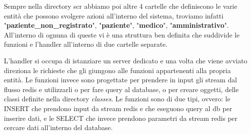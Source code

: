 \documentclass[12pt]{report}
\begin{document}
    Sempre nella directory scr abbiamo poi altre 4 cartelle che definiscono le varie entità che possono svolgere azioni all'interno del sistema, troviamo infatti "\textbf{paziente\_non\_registrato}", "\textbf{paziente}", "\textbf{medico}", "\textbf{amministrativo}". All'interno di ognuna di queste vi è una struttura ben definita che suddivide le funzioni e l'handler all'interno di due cartelle separate.
    
    L'handler si occupa di istanziare un server dedicato e una volta che viene avviato direziona le richieste che gli giungono alle funzioni appartenenti alla propria entità.
    Le funzioni invece sono progettate per prendere in input gli stream dal flusso redis e utilizzarli o per fare query al database, o per creare oggetti, delle classi definite nella directory \textit{classes}. Le funzioni sono di due tipi, ovvero: le INSERT che prendono input da stream redis e che eseguono query al db per inserire dati, e le SELECT che invece prendono parametri da stream redis per cercare dati all'interno del database.
\end{document}
